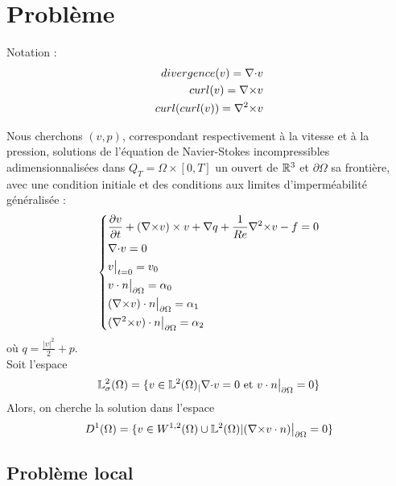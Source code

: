 \section{Problème}
Notation :
\begin{eqnarray*}
divergence(v)={\nabla\cdot} v\\
curl(v)={\nabla\times} v\\
curl(curl(v))={\nabla^2\times} v
\end{eqnarray*}

Nous cherchons $(v,p)$, correspondant respectivement à la vitesse et à la pression, solutions de l'équation de Navier-Stokes incompressibles adimensionnalisées dans $Q_T=\Omega\times[0,T]$ un ouvert de ${\mathbb{R}}^3$ et $\partial\Omega$ sa frontière, avec une condition initiale et des conditions aux limites d'imperméabilité généralisée :
\begin{eqnarray}
\label{depart}
\left\{
\begin{aligned}
&\frac{\partial v}{\partial t} + ({\nabla\times}  v)\times v + {\nabla} q + \frac{1}{Re}{\nabla^2\times}  v-f = 0\\
&{\nabla\cdot} v = 0\\
&v\big\rvert_{t=0} = v_0\\
&v\cdot n{\big\rvert_{\partial\Omega}} = \alpha_0\\
&({\nabla\times}  v)\cdot n{\big\rvert_{\partial\Omega}} = \alpha_1\\
&({\nabla^2\times}  v)\cdot n{\big\rvert_{\partial\Omega}} = \alpha_2
\end{aligned}
\right.
\end{eqnarray}
où $q = \frac{|v|^2}{2}+p$.\\

Soit l'espace
\[
{\mathbb{L}}^2_\sigma(\Omega) = \{v \in {\mathbb{L}}^2(\Omega)_| {\nabla\cdot} v = 0\text{ et }v\cdot n{\big\rvert_{\partial\Omega}} = 0 \}
\]
Alors, on cherche la solution dans l'espace
\[
D^1(\Omega) = \{v\in W^{1,2}(\Omega) \cup {\mathbb{L}}^2(\Omega) | ({\nabla\times} v\cdot n){\big\rvert_{\partial\Omega}} = 0  \}
\]

\subsection{Problème local}

